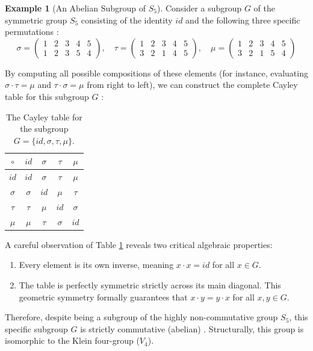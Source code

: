 \documentclass[11pt]{article}
\theoremstyle{definition}
\newtheorem{example}{Example}[section]
\theoremstyle{plain}
\theoremstyle{remark}
\begin{document}
\begin{example}[An Abelian Subgroup of $S_5$]
Consider a subgroup $G$ of the symmetric group $S_5$ consisting of the identity $id$ and the following three specific permutations \cite{dummit}:
\begin{equation}
    \sigma = \begin{pmatrix} 1 & 2 & 3 & 4 & 5 \\ 1 & 2 & 3 & 5 & 4 \end{pmatrix}, \quad 
    \tau = \begin{pmatrix} 1 & 2 & 3 & 4 & 5 \\ 3 & 2 & 1 & 4 & 5 \end{pmatrix}, \quad 
    \mu = \begin{pmatrix} 1 & 2 & 3 & 4 & 5 \\ 3 & 2 & 1 & 5 & 4 \end{pmatrix}
\end{equation}

By computing all possible compositions of these elements (for instance, evaluating $\sigma \cdot \tau = \mu$ and $\tau \cdot \sigma = \mu$ from right to left), we can construct the complete Cayley table for this subgroup $G$ \cite{fraleigh}:

\begin{table}[H]
    \centering
    \renewcommand{\arraystretch}{1.5} %
    \setlength{\tabcolsep}{10pt} %
    \begin{tabular}{c|cccc}
        $\circ$ & $id$ & $\sigma$ & $\tau$ & $\mu$ \\
        \hline
        $id$ & $id$ & $\sigma$ & $\tau$ & $\mu$ \\
        $\sigma$ & $\sigma$ & $id$ & $\mu$ & $\tau$ \\
        $\tau$ & $\tau$ & $\mu$ & $id$ & $\sigma$ \\
        $\mu$ & $\mu$ & $\tau$ & $\sigma$ & $id$ \\
    \end{tabular}
    \caption{The Cayley table for the subgroup $G = \{id, \sigma, \tau, \mu\}$.}
    \label{tab:cayley_S5_subgroup}
\end{table}

A careful observation of Table \ref{tab:cayley_S5_subgroup} reveals two critical algebraic properties:
\begin{enumerate}
    \item Every element is its own inverse, meaning $x \cdot x = id$ for all $x \in G$.
    \item The table is perfectly symmetric strictly across its main diagonal. This geometric symmetry formally guarantees that $x \cdot y = y \cdot x$ for all $x, y \in G$.
\end{enumerate}
Therefore, despite being a subgroup of the highly non-commutative group $S_5$, this specific subgroup $G$ is strictly commutative (abelian) \cite{gallian}. Structurally, this group is isomorphic to the Klein four-group ($V_4$).
\end{example}
\end{document}
